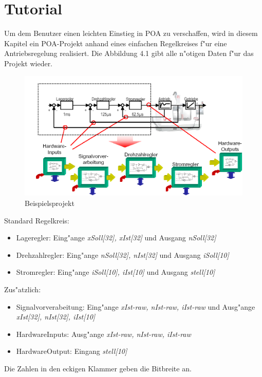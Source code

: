 
\chapter {Tutorial}
Um dem Benutzer einen leichten Einstieg in POA zu verschaffen, wird in diesem Kapitel ein POA-Projekt anhand eines einfachen Regelkreises f"ur eine Antriebsregelung realisiert. Die Abbildung 4.1 gibt alle n"otigen Daten f"ur das Projekt wieder.
\begin{figure}[htbp]

\begin{center}

\includegraphics[width=15cm]{Beispielsprojekt}
\caption{Beispielsprojekt}\label{test}
\end{center}

\end{figure}
\newline
Standard Regelkreis:
\begin{itemize}
	\item Lageregler: Eing"ange {\itshape xSoll[32], xIst[32]} und Ausgang {\itshape nSoll[32]}
	\item Drehzahlregler: Eing"ange {\itshape nSoll[32], nIst[32]} und Ausgang {\itshape iSoll[10]}
	\item Stromregler: Eing"ange {\itshape iSoll[10], iIst[10]} und Ausgang {\itshape stell[10]}
\end{itemize}

Zus"atzlich:
\begin{itemize}
	\item Signalvorverabeitung: Eing"ange {\itshape xIst-raw, nIst-raw, iIst-raw} und Ausg"ange {\itshape xIst[32], nIst[32], iIst[10]}
	\item HardwareInputs: Ausg"ange {\itshape xIst-raw, nIst-raw, iIst-raw}
	\item HardwareOutput: Eingang {\itshape stell[10]}
\end{itemize}
Die Zahlen in den eckigen Klammer geben die Bitbreite an.
\par

